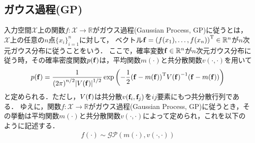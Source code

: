 \documentclass[11pt,a4j]{jarticle}
\begin{document}
    \subsection{ガウス過程(GP)}
      入力空間$\mathcal{X}$上の関数$f: \mathcal{X} \to \mathbb{R}$がガウス過程(Gaussian Process, GP)に従うとは，$\mathcal{X}$上の任意の$n$点${ \{ x_i \} }_{i=1}^{n}$に対して，
      ベクトル${\bf f} = { ( f(x_1),\dots,f(x_n) ) }^{\mathrm{T}} \in \mathbb{R}^{n}$が$n$次元ガウス分布に従うことをいう．
      ここで，確率変数${\bf f} \in \mathbb{R}^{n}$が$n$次元ガウス分布に従う時，その確率密度関数$p({\bf f})$は，平均関数${m}(\cdot)$と共分散関数$v(\cdot,\cdot)$を用いて
      \begin{align}
        p({\bf f}) = \frac{1}{ {(2 \pi)}^{n/2} {| V({\bf f}) |}^{1/2} } \exp \left( {- \frac{1}{2}} {({\bf f} - m(\bf f))}^{\mathrm{T}} {V({\bf f})}^{-1} ({\bf f} - m(\bf f)) \right)
      \end{align}
      と定められる．ただし，$V({\bf f})$は共分散$v({\bf f}_i, {\bf f}_j)$を$ij$要素にもつ共分散行列である．
      ゆえに，関数$f: \mathcal{X} \to \mathbb{R}$がガウス過程(Gaussian Process, GP)に従うとき，その挙動は平均関数${m}(\cdot)$と共分散関数$v(\cdot,\cdot)$によって定められ，これを以下のように記述する．
      \begin{align}
        f(\cdot) \sim \mathcal{GP}(m(\cdot), v(\cdot,\cdot))
      \end{align}    
\end{document}
